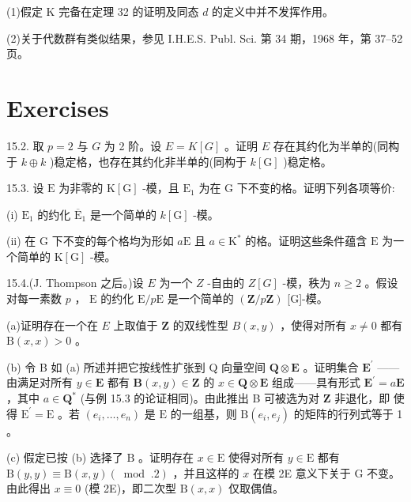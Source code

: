 \documentclass[10pt]{article}
\begin{document}
(1)假定 \(\mathrm{K}\) 完备在定理 32 的证明及同态 \(d\) 的定义中并不发挥作用。

(2)关于代数群有类似结果，参见 I.H.E.S. Publ. Sci. 第 34 期，1968 年，第 37–52 页。

\section*{Exercises}

15.2. 取 \(p = 2\) 与 \(G\) 为 2 阶。设 \(E = K\left\lbrack  G\right\rbrack\) 。证明 \(E\) 存在其约化为半单的(同构于 \(k \oplus  k\) )稳定格，也存在其约化非半单的(同构于 \(k\left\lbrack  \mathrm{G}\right\rbrack\) )稳定格。

15.3. 设 \(\mathrm{E}\) 为非零的 \(\mathrm{K}\left\lbrack  \mathrm{G}\right\rbrack\) -模，且 \({\mathrm{E}}_{1}\) 为在 \(\mathrm{G}\) 下不变的格。证明下列各项等价:

(i) \({\mathrm{E}}_{1}\) 的约化 \({\overline{\mathrm{E}}}_{1}\) 是一个简单的 \(k\left\lbrack  \mathrm{G}\right\rbrack\) -模。

(ii) 在 \(\mathrm{G}\) 下不变的每个格均为形如 \(a\mathrm{E}\) 且 \(a \in  {\mathrm{K}}^{ * }\) 的格。证明这些条件蕴含 \(\mathrm{E}\) 为一个简单的 \(\mathrm{K}\left\lbrack  \mathrm{G}\right\rbrack\) -模。

15.4.(J. Thompson 之后。)设 \(E\) 为一个 \(Z\) -自由的 \(Z\left\lbrack  G\right\rbrack\) -模，秩为 \(n \geq  2\) 。假设对每一素数 \(p\) ， \(\mathrm{E}\) 的约化 \(\mathrm{E}/p\mathrm{E}\) 是一个简单的 \(\left( {\mathbf{Z}/p\mathbf{Z}}\right)\) [G]-模。

(a)证明存在一个在 \(E\) 上取值于 \(\mathbf{Z}\) 的双线性型 \(B\left( {x,y}\right)\) ，使得对所有 \(x \neq  0\) 都有 \(\mathrm{B}\left( {x,x}\right)  > 0\) 。

(b) 令 B 如 (a) 所述并把它按线性扩张到 Q 向量空间 \(\mathbf{Q} \otimes  \mathbf{E}\) 。证明集合 \({\mathbf{E}}^{\prime }\) ——由满足对所有 \(y \in  \mathbf{E}\) 都有 \(\mathbf{B}\left( {x,y}\right)  \in  \mathbf{Z}\) 的 \(x \in  \mathbf{Q} \otimes  \mathbf{E}\) 组成——具有形式 \({\mathbf{E}}^{\prime } = a\mathbf{E}\) ，其中 \(a \in  {\mathbf{Q}}^{ * }\) (与例 15.3 的论证相同)。由此推出 B 可被选为对 \(\mathbf{Z}\) 非退化，即 使得 \({\mathrm{E}}^{\prime } = \mathrm{E}\) 。若 \(\left( {{e}_{i},\ldots ,{e}_{n}}\right)\) 是 \(\mathrm{E}\) 的一组基，则 \(\mathrm{B}\left( {{e}_{i},{e}_{j}}\right)\) 的矩阵的行列式等于 1 。

(c) 假定已按 (b) 选择了 \(\mathrm{B}\) 。证明存在 \(x \in  \mathrm{E}\) 使得对所有 \(y \in  \mathrm{E}\) 都有 \(\mathrm{B}\left( {y,y}\right)  \equiv  \mathrm{B}\left( {x,y}\right) \left( {\;\operatorname{mod}\;{.2}}\right)\) ，并且这样的 \(x\) 在模 2E 意义下关于 G 不变。由此得出 \(x \equiv  0\) (模 2E)，即二次型 \(\mathrm{B}\left( {x,x}\right)\) 仅取偶值。
\end{document}
